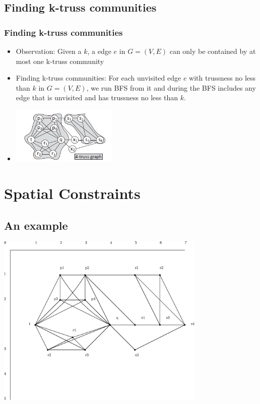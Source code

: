 \documentclass{beamer}
\begin{document}
\subsection{Finding k-truss communities}
\begin{frame}
\frametitle{Finding k-truss communities}
\begin{itemize}
\item Observation: Given a $k$, a edge $e$ in $G=(V,E)$ can only be contained by at most one k-truss community
\item Finding k-truss communities: For each unvisited edge $e$ with trussness no less than $k$ in $G=(V,E)$, we run BFS from it and during the BFS includes any edge that is unvisited and has trussness no less than $k$.
\item \includegraphics[width=5cm]{trusssample.jpg}
\end{itemize}
\end{frame}

\section{Spatial Constraints}

\subsection{An example}
\begin{frame}
	\includegraphics[width=10cm]{sg.eps}
\end{frame}
\end{document}
